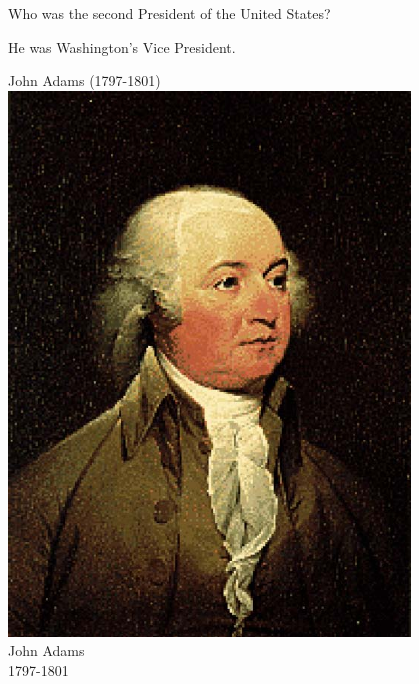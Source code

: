 \documentclass{article}
\def\rescale{.4} %
\begin{document}
\begin{card}
    Who was the second President of the United States?
\begin{response}
    \begin{hint}
        He was Washington's Vice President.
    \end{hint}
    \begin{answer}
    \ifecListing
        John Adams (1797-1801)
    \else\centering
            \includegraphics[scale=\rescale]{presidents/ja2}\\
                John Adams\\
                1797-1801
    \fi
    \end{answer}
\end{response}
\end{card}
\end{document}
